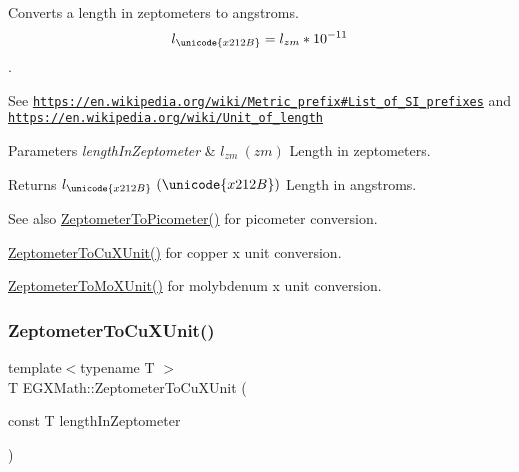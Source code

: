 Converts a length in zeptometers to angstroms. \[ l_{\unicode{x212B}}=l_{zm} * 10^{-11} \]. 

See \href{https://en.wikipedia.org/wiki/Metric_prefix#List_of_SI_prefixes}{\tt https\+://en.\+wikipedia.\+org/wiki/\+Metric\+\_\+prefix\#\+List\+\_\+of\+\_\+\+S\+I\+\_\+prefixes} and \href{https://en.wikipedia.org/wiki/Unit_of_length}{\tt https\+://en.\+wikipedia.\+org/wiki/\+Unit\+\_\+of\+\_\+length} 
\begin{DoxyParams}{Parameters}
{\em length\+In\+Zeptometer} & $ l_{zm}\ (zm)$ Length in zeptometers. \\
\hline
\end{DoxyParams}
\begin{DoxyReturn}{Returns}
$ l_{\unicode{x212B}}\ (\unicode{x212B})$ Length in angstroms. 
\end{DoxyReturn}
\begin{DoxySeeAlso}{See also}
\mbox{\hyperlink{group___e_g_x_math-_conversions-_length_conversions-_s_i-_zeptometer-_s_i_gae7409493227692a85b7fa5016a007de3}{Zeptometer\+To\+Picometer()}} for picometer conversion. 

\mbox{\hyperlink{group___e_g_x_math-_conversions-_length_conversions-_s_i-_zeptometer-_non-_s_i_gaeeff3d1ea7d8cd0c703419ce16fcadd7}{Zeptometer\+To\+Cu\+X\+Unit()}} for copper x unit conversion. 

\mbox{\hyperlink{group___e_g_x_math-_conversions-_length_conversions-_s_i-_zeptometer-_non-_s_i_gaa621a874847d7e6aae8d04395c68a313}{Zeptometer\+To\+Mo\+X\+Unit()}} for molybdenum x unit conversion. 
\end{DoxySeeAlso}
\mbox{\label{group___e_g_x_math-_conversions-_length_conversions-_s_i-_zeptometer-_non-_s_i_gaeeff3d1ea7d8cd0c703419ce16fcadd7}} 
\subsubsection{\texorpdfstring{Zeptometer\+To\+Cu\+X\+Unit()}{ZeptometerToCuXUnit()}}
{\footnotesize\ttfamily template$<$typename T $>$ \\
T E\+G\+X\+Math\+::\+Zeptometer\+To\+Cu\+X\+Unit (\begin{DoxyParamCaption}\item[{const T}]{length\+In\+Zeptometer }\end{DoxyParamCaption})}



